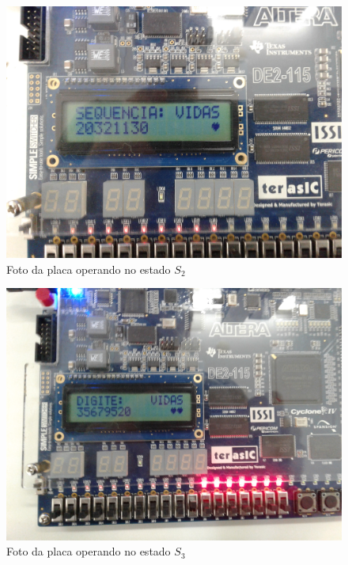 \documentclass[14pt, oneside]{book}
\theoremstyle{definition}
\begin{document}
               \begin{figure}[H]
                    \centering
                    \includegraphics[scale=0.14]{foto_placa_sequencia.jpg}
                    \caption{Foto da placa operando no estado $S_2$}
                    \label{sequencia}
                \end{figure}
                
                 \begin{figure}[H]
                    \centering
                    \includegraphics[scale=0.14]{foto_placa_digite.jpg}
                    \caption{Foto da placa operando no estado $S_3$}
                    \label{digite}
                \end{figure}
                
\end{document}

